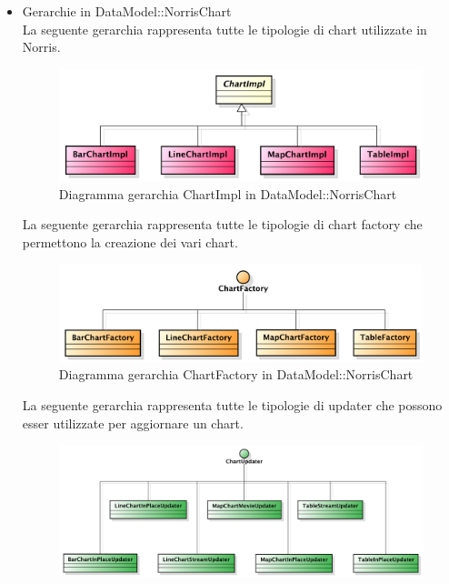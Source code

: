 		\begin{itemize}
			\item Gerarchie in DataModel::NorrisChart \\
				La seguente gerarchia rappresenta tutte le tipologie di chart utilizzate in Norris.
				\begin{figure}[H]
	                \centering
	                \includegraphics[width=1\textwidth]{DefinizioneDiProdotto/Pics/Gerarchie/ModelChartImpl.pdf}
	                \caption{Diagramma gerarchia ChartImpl in DataModel::NorrisChart}
	            \end{figure}
				La seguente gerarchia rappresenta tutte le tipologie di chart factory che permettono la creazione dei vari chart.
				\begin{figure}[H]
	                \centering
	                \includegraphics[width=1\textwidth]{DefinizioneDiProdotto/Pics/Gerarchie/ModelFactory.pdf}
	                \caption{Diagramma gerarchia ChartFactory in DataModel::NorrisChart}
	            \end{figure}
				La seguente gerarchia rappresenta tutte le tipologie di updater che possono esser utilizzate per aggiornare un chart.
				\begin{figure}[H]
	                \centering
	                \includegraphics[width=1\textwidth]{DefinizioneDiProdotto/Pics/Gerarchie/ModelUpdater.pdf}

\end{figure}
\end{itemize}

